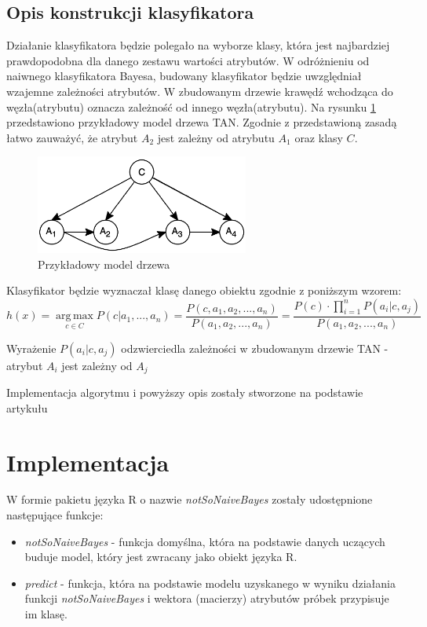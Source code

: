 \documentclass[paper=a4, fontsize=11pt]{scrartcl} %
\numberwithin{equation}{section} %
\numberwithin{figure}{section} %
\numberwithin{table}{section} %
\begin{document}
\subsection{Opis konstrukcji klasyfikatora}
Działanie klasyfikatora będzie polegało na wyborze klasy, która jest najbardziej prawdopodobna dla danego zestawu wartości atrybutów. W odróżnieniu od  naiwnego klasyfikatora Bayesa, budowany klasyfikator będzie uwzględniał wzajemne zależności atrybutów. W zbudowanym drzewie krawędź wchodząca do węzła(atrybutu) oznacza zależność od innego węzła(atrybutu). Na rysunku \ref{fig:model_drzewa} przedstawiono przykładowy model drzewa TAN. Zgodnie z przedstawioną zasadą łatwo zauważyć, że atrybut $A_2$ jest zależny od atrybutu $A_1$ oraz klasy $C$.
\begin{figure}[h]
 \centering
 \includegraphics[width=70mm]{model1.png}
 \caption{Przykładowy model drzewa}
 \label{fig:model_drzewa}
\end{figure}

Klasyfikator będzie wyznaczał klasę danego obiektu zgodnie z poniższym wzorem:
\[h(x) = \operatorname*{arg\,max}_{c \in C} P(c|a_1,...,a_n)= \frac{P(c,a_1,a_2,...,a_n)}{P(a_1,a_2,...,a_n)}= 
\frac {P(c) \cdot \prod_{i=1}^{n} {P(a_i|c,a_j)}}{P(a_1,a_2,...,a_n)} \]

Wyrażenie $P(a_i|c,a_j)$ odzwierciedla zależności w zbudowanym drzewie TAN - atrybut $A_i$ jest zależny od $A_j$

Implementacja algorytmu i powyższy opis zostały stworzone na podstawie artykułu \cite{Bayesian_Network_Classifiers}

\section{Implementacja}

W formie pakietu  języka R o nazwie \textit{notSoNaiveBayes} zostały udostępnione następujące funkcje:
\begin{itemize}
 \item \textit{notSoNaiveBayes} - funkcja domyślna, która na podstawie danych uczących buduje model, który jest zwracany jako obiekt języka R.
 \item \textit{predict} - funkcja, która na podstawie modelu uzyskanego w wyniku działania funkcji \textit{notSoNaiveBayes} i wektora (macierzy) atrybutów próbek przypisuje im klasę.
\end{itemize}
\end{document}
